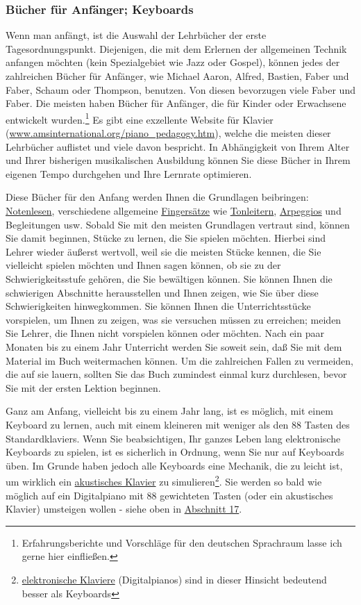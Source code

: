 \subsubsection{Bücher für Anfänger; Keyboards}
\label{c1iii18b}

Wenn man anfängt, ist die Auswahl der Lehrbücher der erste Tagesordnungspunkt.
Diejenigen, die mit dem Erlernen der allgemeinen Technik anfangen möchten (kein Spezialgebiet wie Jazz oder Gospel), können jedes der zahlreichen Bücher für Anfänger, wie Michael Aaron, Alfred, Bastien, Faber und Faber, Schaum oder Thompson, benutzen.
Von diesen bevorzugen viele Faber und Faber.
Die meisten haben Bücher für Anfänger, die für Kinder oder Erwachsene entwickelt wurden.\footnote{Erfahrungsberichte und Vorschläge für den deutschen Sprachraum lasse ich gerne hier einfließen.}
Es gibt eine exzellente Website für Klavier (\url{www.amsinternational.org/piano_pedagogy.htm}), welche die meisten dieser Lehrbücher auflistet und viele davon bespricht.
In Abhängigkeit von Ihrem Alter und Ihrer bisherigen musikalischen Ausbildung können Sie diese Bücher in Ihrem eigenen Tempo durchgehen und Ihre Lernrate optimieren.

Diese Bücher für den Anfang werden Ihnen die Grundlagen beibringen: \hyperref[c1iii11]{Notenlesen}, verschiedene allgemeine \hyperref[c1ii18]{Fingersätze} wie \hyperref[c1iii5a]{Tonleitern}, \hyperref[Arpeggios]{Arpeggios} und Begleitungen usw.
Sobald Sie mit den meisten Grundlagen vertraut sind, können Sie damit beginnen, Stücke zu lernen, die Sie spielen möchten.
Hierbei sind Lehrer wieder äußerst wertvoll, weil sie die meisten Stücke kennen, die Sie vielleicht spielen möchten und 
Ihnen sagen können, ob sie zu der Schwierigkeitsstufe gehören, die Sie bewältigen können.
Sie können Ihnen die schwierigen Abschnitte herausstellen und Ihnen zeigen, wie Sie über diese Schwierigkeiten hinwegkommen.
Sie können Ihnen die Unterrichtsstücke vorspielen, um Ihnen zu zeigen, was sie versuchen müssen zu erreichen; meiden Sie Lehrer, die Ihnen nicht vorspielen können oder möchten.
Nach ein paar Monaten bis zu einem Jahr Unterricht werden Sie soweit sein, daß Sie mit dem Material im Buch weitermachen können.
Um die zahlreichen Fallen zu vermeiden, die auf sie lauern, sollten Sie das Buch zumindest einmal kurz durchlesen, bevor Sie mit der ersten Lektion beginnen.

Ganz am Anfang, vielleicht bis zu einem Jahr lang, ist es möglich, mit einem Keyboard zu lernen, auch mit einem kleineren mit weniger als den 88 Tasten des Standardklaviers.
Wenn Sie beabsichtigen, Ihr ganzes Leben lang elektronische Keyboards zu spielen, ist es sicherlich in Ordnung, wenn Sie nur auf Keyboards üben.
Im Grunde haben jedoch alle Keyboards eine Mechanik, die zu leicht ist, um wirklich ein \hyperref[c1iii17c]{akustisches Klavier} zu simulieren\footnote{\hyperref[c1iii17b]{elektronische Klaviere} (Digitalpianos) sind in dieser Hinsicht bedeutend besser als Keyboards}.
Sie werden so bald wie möglich auf ein Digitalpiano mit 88 gewichteten Tasten (oder ein akustisches Klavier) umsteigen wollen - siehe oben in \hyperref[c1iii17]{Abschnitt 17}.


